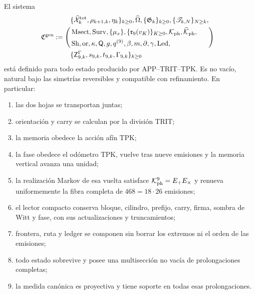\begin{theorem}
\label{thm:continuo-comun-propietario}
El sistema
\begin{equation}
\label{eq:continuo-comun-propietario}
 \mathfrak C^{\rm gen}:=\Biggl(
 \begin{aligned}
 &\{\widehat{\mathcal X}^{\rm tot}_k,\rho_{k+1,k},\eta_k\}_{k\geq0},
   \widehat\Omega,\{\mathfrak G_k\}_{k\geq0},
   \{\mathscr T_{k,N}\}_{N\geq k},\\
 &\operatorname{Msect},\operatorname{Surv},\{\mu_x\},
   \{\mathfrak r_9(v_K)\}_{K\geq0},
   \mathcal K_{\rm ph},\widehat{\mathcal K}_{\rm ph},\\
 &\operatorname{Sh},\operatorname{or},\kappa,
   \mathsf Q,g,q^{(9)},\beta,m,\partial,\gamma,\operatorname{Led},\\
 &\{\mathsf Z^\Gamma_{9,k},s_{9,k},t_{9,k},\Gamma_{9,k}\}_{k\geq0}
 \end{aligned}
 \Biggr)
\end{equation}
está definido para todo estado producido por APP--TRIT--TPK\@.  Es no vacío,
natural bajo las simetrías reversibles y compatible con refinamiento.  En
particular:
\begin{enumerate}
 \item las dos hojas se transportan juntas;
 \item orientación y carry se calculan por la división TRIT;
 \item la memoria obedece la acción afín TPK;
 \item la fase obedece el odómetro TPK, vuelve tras nueve emisiones y la
       memoria vertical avanza una unidad;
 \item la realización Markov de esa vuelta satisface
       \(\mathcal K_{\rm ph}^9=E_+E_\times\) y renueva uniformemente la
       fibra completa de \(468=18\cdot26\) emisiones;
 \item el lector compacto conserva bloque, cilindro, prefijo, carry, firma,
       sombra de Witt y fase, con sus actualizaciones y truncamientos;
 \item frontera, ruta y ledger se componen sin borrar los extremos ni el
       orden de las emisiones;
 \item todo estado sobrevive y posee una multisección no vacía de
       prolongaciones completas;
 \item la medida canónica es proyectiva y tiene soporte en todas esas
       prolongaciones.
\end{enumerate}
\end{theorem}

